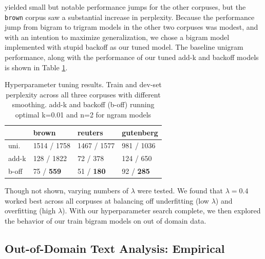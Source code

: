 \documentclass[11pt,a4paper]{article}
\begin{document}


yielded small but notable performance jumps for the other corpuses, but the \texttt{brown} corpus saw a substantial increase in perplexity. Because the
performance jump from bigram to trigram models in the other two corpuses was modest, and with an intention to maximize generalization, we chose a bigram
model implemented with stupid backoff as our tuned model. The baseline unigram performance, along with the performance of our tuned add-k and backoff models
is shown in Table \ref{table:hyperparameter}.


\begin{table}
\begin{tabular}{llll}
\hline
         & brown       & reuters     & gutenberg   \\
\hline
 uni. & 1514 / 1758 & 1467 / 1577 & 981 / 1036  \\
 add-k   & 128 / 1822  & 72 / 378    & 124 / 650   \\
 b-off & 75 / \textbf{ 559 }    & 51 / \textbf{ 180 }    & 92 / \textbf{ 285 }    \\
\hline
\end{tabular}
\caption{Hyperparameter tuning results. Train and dev-set perplexity across
all three corpuses with different smoothing. add-k and backoff (b-off) 
running optimal k=0.01 and n=2 for ngram models}
\label{table:hyperparameter}
\end{table}


Though not shown, varying numbers of $\lambda$ were tested. We found that $\lambda = 0.4$ worked best across all corpuses at
balancing off underfitting (low $\lambda$) and overfitting (high $\lambda$). With our hyperparameter search complete, we 
then explored the behavior of our train bigram models on out of domain data.


\subsection{Out-of-Domain Text Analysis: Empirical}%
\label{sec:out_domain_text_analysis_empirical}
\end{document}
